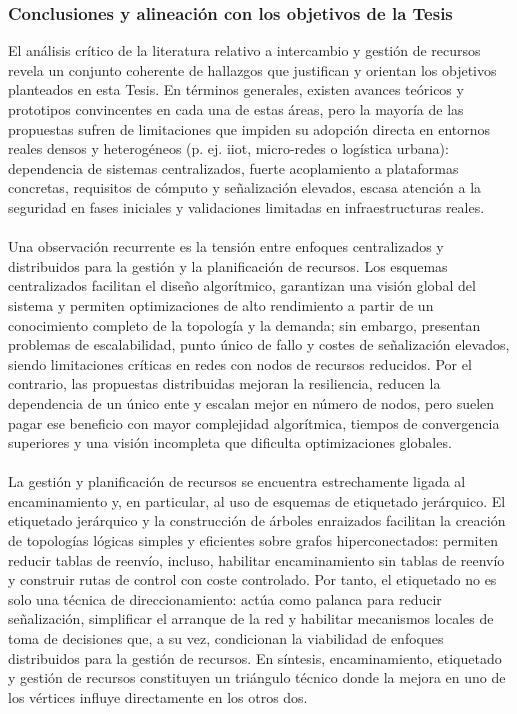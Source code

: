 \subsubsection{Conclusiones y alineación con los objetivos de la Tesis}
\label{subsubsec:conclu_recursos}
El análisis crítico de la literatura relativo a intercambio y gestión de recursos revela un conjunto coherente de hallazgos que justifican y orientan los objetivos planteados en esta Tesis. En términos generales, existen avances teóricos y prototipos convincentes en cada una de estas áreas, pero la mayoría de las propuestas sufren de limitaciones que impiden su adopción directa en entornos reales densos y heterogéneos (p. ej. \gls{iiot}, micro-redes o logística urbana): dependencia de sistemas centralizados, fuerte acoplamiento a plataformas concretas, requisitos de cómputo y señalización elevados, escasa atención a la seguridad en fases iniciales y validaciones limitadas en infraestructuras reales.\\
\\
Una observación recurrente es la tensión entre enfoques centralizados y distribuidos para la gestión y la planificación de recursos. Los esquemas centralizados facilitan el diseño algorítmico, garantizan una visión global del sistema y permiten optimizaciones de alto rendimiento a partir de un conocimiento completo de la topología y la demanda; sin embargo, presentan problemas de escalabilidad, punto único de fallo y costes de señalización elevados, siendo limitaciones críticas en redes con nodos de recursos reducidos. Por el contrario, las propuestas distribuidas mejoran la resiliencia, reducen la dependencia de un único ente y escalan mejor en número de nodos, pero suelen pagar ese beneficio con mayor complejidad algorítmica, tiempos de convergencia superiores y una visión incompleta que dificulta optimizaciones globales.\\
\\
La gestión y planificación de recursos se encuentra estrechamente ligada al encaminamiento y, en particular, al uso de esquemas de etiquetado jerárquico. El etiquetado jerárquico y la construcción de árboles enraizados facilitan la creación de topologías lógicas simples y eficientes sobre grafos hiperconectados: permiten reducir tablas de reenvío, incluso, habilitar encaminamiento sin tablas de reenvío y construir rutas de control con coste controlado. Por tanto, el etiquetado no es solo una técnica de direccionamiento: actúa como palanca para reducir señalización, simplificar el arranque de la red  y habilitar mecanismos locales de toma de decisiones que, a su vez, condicionan la viabilidad de enfoques distribuidos para la gestión de recursos. En síntesis, encaminamiento, etiquetado y gestión de recursos constituyen un triángulo técnico donde la mejora en uno de los vértices influye directamente en los otros dos.\\
